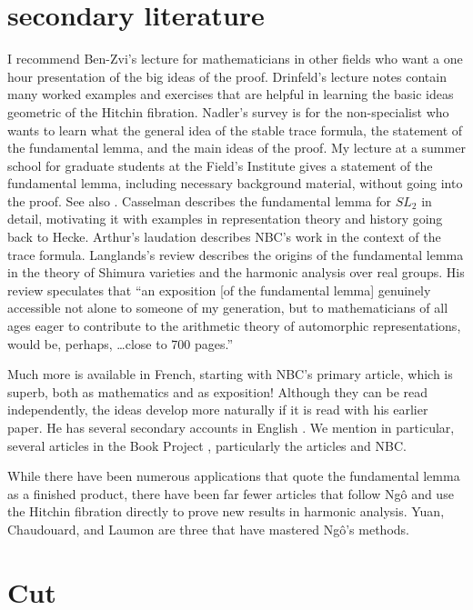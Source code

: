 \documentclass[brochure,english,12pt]{bourbaki}
\begin{document}
\section{secondary literature}

I recommend Ben-Zvi's lecture for mathematicians in other fields who
want a one hour presentation of the big ideas of the proof.
Drinfeld's lecture notes contain many worked examples and exercises
that are helpful in learning the basic ideas geometric of the Hitchin
fibration.  Nadler's survey is for the non-specialist who wants to
learn what the general idea of the stable trace formula, the statement
of the fundamental lemma, and the main ideas of the proof.  My lecture
at a summer school for graduate students at the Field's Institute
gives a statement of the fundamental lemma, including necessary
background material, without going into the proof.  See also
\cite{Hales}.  Casselman describes the fundamental lemma for $SL_2$ in
detail, motivating it with examples in representation theory and
history going back to Hecke.  Arthur's laudation describes NBC's work
in the context of the trace formula.  Langlands's review describes the
origins of the fundamental lemma in the theory of Shimura varieties
and the harmonic analysis over real groups.  His review speculates
that ``an exposition [of the fundamental lemma] genuinely accessible
not alone to someone of my generation, but to mathematicians of all
ages eager to contribute to the arithmetic theory of automorphic
representations, would be, perhaps, \ldots close to 700 pages.''


Much more is available in French, starting with NBC's primary article,
which is superb, both as mathematics and as exposition!  Although they
can be read independently, the ideas develop more naturally if it is
read with his earlier paper.  He has several secondary accounts in
English \cite{XX}.  We mention in particular, several articles in the
Book Project \cite{Harris}, particularly the articles \cite{Dat}
and NBC.

While there have been numerous applications that quote the fundamental
lemma as a finished product, there have been far fewer articles that
follow Ng\^o and use the Hitchin fibration directly to prove new
results in harmonic analysis.  Yuan, Chaudouard, and Laumon are three that
have mastered Ng\^o's methods.

\section{Cut}
\end{document}

